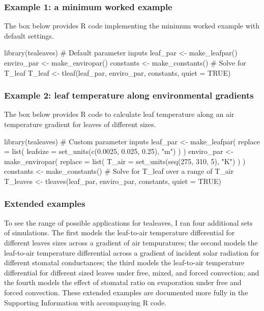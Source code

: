 \documentclass[11pt, oneside]{article}
\newcommand{\pkg}[1]{{\fontseries{b}\selectfont #1}}
\newcommand{\tealeaves}{\pkg{tealeaves}}
\begin{document}
\subsubsection*{Example 1: a minimum worked example}

The box below provides R code implementing the minimum worked example with default settings.

\begin{Schunk}
\begin{Sinput}
   library(tealeaves)
   # Default parameter inputs  
   leaf_par   <- make_leafpar()
   enviro_par <- make_enviropar()
   constants  <- make_constants()
   # Solve for T_leaf
   T_leaf <- tleaf(leaf_par, enviro_par, constants,
                   quiet = TRUE)
 
\end{Sinput}
\end{Schunk}

\subsubsection*{Example 2: leaf temperature along environmental gradients}

The box below provides R code to calculate leaf temperature along an air temperature gradient for leaves of different sizes.

\begin{Schunk}
\begin{Sinput}
   library(tealeaves)
   # Custom parameter inputs
   leaf_par   <- make_leafpar(
     replace = list(
       leafsize = set_units(c(0.0025, 0.025, 0.25), "m")
       )
   )
   enviro_par <- make_enviropar(
     replace = list(
       T_air = set_units(seq(275, 310, 5), "K")
       )
   )
   constants  <- make_constants()
   # Solve for T_leaf over a range of T_air
   T_leaves <- tleaves(leaf_par, enviro_par, constants, 
                       quiet = TRUE)
 
\end{Sinput}
\end{Schunk}

\subsubsection*{Extended examples}

To see the range of possible applications for \tealeaves, I ran four additional sets of simulations. The first models the leaf-to-air temperature differential for different leaves sizes across a gradient of air tempuratures; the second models the leaf-to-air temperature differential across a gradient of incident solar radiation for different stomatal conductances; the third models the leaf-to-air temperature differential for different sized leaves under free, mixed, and forced convection; and the fourth models the effect of stomatal ratio on evaporation under free and forced convection. These extended examples are documented more fully in the Supporting Information with accompanying R code. 
\end{document}

